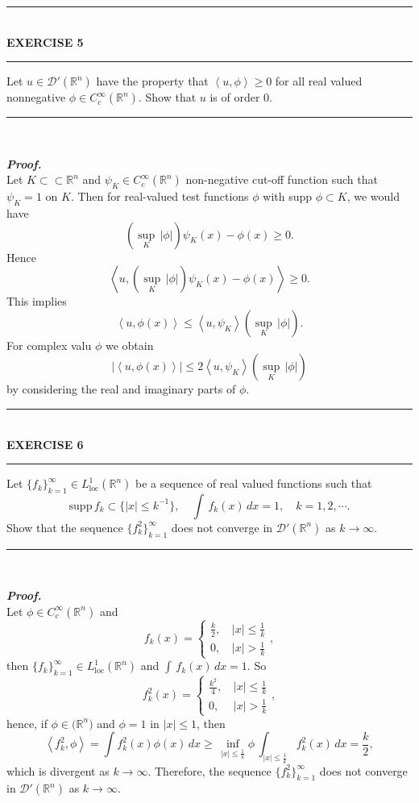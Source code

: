 \documentclass[a4paper,11pt]{article}
\begin{document}
	\begin{flushleft}
		\rule[-0.5ex]{17cm}{2pt}\\
			\textbf{EXERCISE 5}\\
		\rule[1.5ex]{17cm}{0.5pt}
			Let $u \in \mathcal{D}'(\mathbb{R}^n)$ have the property that $\left<u,\phi\right> \geq 0$ for all real valued nonnegative $\phi \in C_c^\infty(\mathbb{R}^n)$. Show that $u$ is of order 0.
		\rule[1.0ex]{17cm}{0.5pt}\
	\end{flushleft}
	\textbf{\textit{Proof.}}\\
	Let $K \subset \subset \mathbb{R}^n$ and $\psi_K \in C_c^\infty (\mathbb{R}^n)$ non-negative cut-off function such that $\psi_K = 1$ on $K$. Then for real-valued test functions $\phi$ with supp $\phi \subset K$, we would have
		$$\left(\sup_K\,|\phi|\right) \psi_K(x) - \phi(x) \geq 0.$$
	Hence
		$$\left<u,\left(\sup_K\,|\phi|\right) \psi_K(x) - \phi(x)\right> \geq 0.$$
	This implies
		$$\left<u, \phi(x)\right>
		\leq \left<u,\psi_K\right> \left(\sup_K\,|\phi|\right).$$
	For complex valu $\phi$ we obtain
		$$|\left<u, \phi(x)\right>|
		\leq 2 \left<u,\psi_K\right> \left(\sup_K\,|\phi|\right)$$
	by considering the real and imaginary parts of $\phi$.\\



	\begin{flushleft}
		\rule[-0.5ex]{17cm}{2pt}\\
			\textbf{EXERCISE 6}\\
		\rule[1.5ex]{17cm}{0.5pt}
			Let $\{f_k\}_{k=1}^\infty \in L_{\text{loc}}^1 (\mathbb{R}^n)$ be a sequence of real valued functions such that
				$$\text{supp}\,f_k \subset \{|x| \leq k^{-1}\},
				\quad \int\,f_k(x)\,dx = 1,
				\quad k = 1,2,\cdots.$$
			Show that the sequence $\{f_k^2\}_{k=1}^\infty$ does not converge in $\mathcal{D}'(\mathbb{R}^n)$ as $k \to \infty$.
		\rule[1.0ex]{17cm}{0.5pt}\
	\end{flushleft}
	\textbf{\textit{Proof.}}\\
	Let $\phi \in C_c^\infty(\mathbb{R}^n)$ and
		$$f_k(x) = \left\{
		\begin{matrix}
		\frac{k}{2},\,&|x| \leq \frac{1}{k}\\
		0,\,&|x| > \frac{1}{k}
		\end{matrix}\right.,$$
	then $\{f_k\}_{k=1}^\infty \in L_{\text{loc}}^1 (\mathbb{R}^n)$ and $\int\,f_k(x)\,dx = 1$. So
		$$f_k^2(x) = \left\{
		\begin{matrix}
		\frac{k^2}{4},\,&|x| \leq \frac{1}{k}\\
		0,\,&|x| > \frac{1}{k}
		\end{matrix}\right.,$$
	hence, if $\phi \in \mathcal(\mathbb{R}^n)$ and $\phi = 1$ in $|x| \leq 1$, then
		$$\left<f_k^2,\phi\right>
		= \int f_k^2(x)\phi(x)\,dx
		\geq\,\underset{|x| \leq \frac{1}{k}}{\inf} \phi\,\int_{|x| \leq \frac{1}{k}} f_k^2(x)\,dx
		= \frac{k}{2},$$
	which is divergent as $k \to \infty$. Therefore, the sequence $\{f_k^2\}_{k=1}^\infty$ does not converge in $\mathcal{D}'(\mathbb{R}^n)$ as $k \to \infty$.\\
\end{document}
